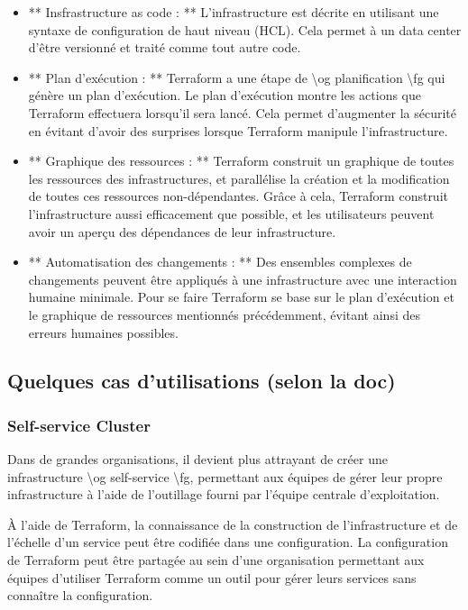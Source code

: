 \documentclass[]{article}
\begin{document}
\begin{itemize}
\item
  ** Insfrastructure as code : ** L'infrastructure est décrite en
  utilisant une syntaxe de configuration de haut niveau (HCL). Cela
  permet à un data center d'être versionné et traité comme tout autre
  code.
\item
  ** Plan d'exécution : ** Terraform a une étape de \textbackslash{}og
  planification \textbackslash{}fg qui génère un plan d'exécution. Le
  plan d'exécution montre les actions que Terraform effectuera lorsqu'il
  sera lancé. Cela permet d'augmenter la sécurité en évitant d'avoir des
  surprises lorsque Terraform manipule l'infrastructure.
\item
  ** Graphique des ressources : ** Terraform construit un graphique de
  toutes les ressources des infrastructures, et parallélise la création
  et la modification de toutes ces ressources non-dépendantes. Grâce à
  cela, Terraform construit l'infrastructure aussi efficacement que
  possible, et les utilisateurs peuvent avoir un aperçu des dépendances
  de leur infrastructure.
\item
  ** Automatisation des changements : ** Des ensembles complexes de
  changements peuvent être appliqués à une infrastructure avec une
  interaction humaine minimale. Pour se faire Terraform se base sur le
  plan d'exécution et le graphique de ressources mentionnés
  précédemment, évitant ainsi des erreurs humaines possibles.
\end{itemize}

\subsection{Quelques cas d'utilisations (selon la
doc)}\label{quelques-cas-dutilisations-selon-la-doc}

\subsubsection{Self-service Cluster}\label{self-service-cluster}

Dans de grandes organisations, il devient plus attrayant de créer une
infrastructure \textbackslash{}og self-service \textbackslash{}fg,
permettant aux équipes de gérer leur propre infrastructure à l'aide de
l'outillage fourni par l'équipe centrale d'exploitation.

À l'aide de Terraform, la connaissance de la construction de
l'infrastructure et de l'échelle d'un service peut être codifiée dans
une configuration. La configuration de Terraform peut être partagée au
sein d'une organisation permettant aux équipes d'utiliser Terraform
comme un outil pour gérer leurs services sans connaître la
configuration.
\end{document}
